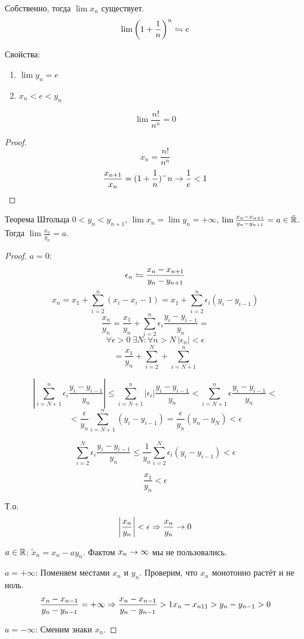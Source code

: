 Собственно, тогда $\lim x_n$ существует.
$$\lim \left(1+\frac1n\right)^n \leftrightharpoons e$$

Свойства:
\begin{enumerate}
\item $\lim y_n = e$
\item $x_n < e < y_n$
\end{enumerate}

\begin{conseq}
$$\lim \frac{n!}{n^n} = 0$$
\end{conseq}
\begin{proof}
$$x_n = \frac{n!}{n^n}$$
$$\frac{x_{n+1}}{x_n} = (1+\frac1n)^-n \rightarrow \frac1e < 1$$
\end{proof}

\begin{theorem}{Теорема Штольца}
$0<y_n<y_{n+1}$, $\lim x_n = \lim y_n = +\infty$, $\lim \frac{x_n-x_{n+1}}{y_n-y_{n+1}} = a \in \bar{\mathbb{R}}$.
Тогда $\lim \frac{x_n}{y_n} = a$.
\end{theorem}
\begin{proof}
$a = 0$:
$$\epsilon_n \leftrightharpoons \frac{x_n - x_{n+1}}{y_n - y_{n+1}}$$
$$x_n = x_1 + \sum_{i=2}^n (x_i - x_i-1) = x_1 + \sum_{i=2}^n \epsilon_i(y_i - y_{i-1})$$
$$\frac{x_n}{y_n} = \frac{x_1}{y_n} + \sum_{i=2}^n \epsilon_i \frac{y_i - y_{i-1}}{y_n} = $$
$$\forall \epsilon > 0\: \exists N\colon \forall n > N\: |\epsilon_n| < \epsilon$$
$$= \frac{x_1}{y_n} + \sum_{i=2}^N + \sum_{i=N+1}^n$$

$$\left|\sum_{i=N+1}^n \epsilon_i \frac{y_i - y_{i-1}}{y_n}\right| \leqslant \sum_{i=N+1}^n |\epsilon_i| \frac{y_i - y_{i-1}}{y_n} < 
\sum_{i=N+1}^n \epsilon \frac{y_i - y_{i-1}}{y_n} <$$
$$< \frac{\epsilon}{y_n}\sum_{i=N+1}^n (y_i - y_{i-1}) = \frac{\epsilon}{y_n} (y_n - y_N) < \epsilon$$

$$\sum_{i=2}^N \epsilon_i \frac{y_i - y_{i-1}}{y_n} \leqslant \frac{1}{y_n}\sum_{i=2}^N \epsilon_i(y_i - y_{i-1}) < \epsilon$$

$$\frac{x_1}{y_n} < \epsilon$$

Т.о.
$$\left|\frac{x_n}{y_n}\right| < \epsilon \Rightarrow \frac{x_n}{y_n} \rightarrow 0$$

$a\in\mathbb{R}$:
$\tilde x_n = x_n - a y_n$. Фактом $x_n\rightarrow\infty$ мы не пользовались.

$a=+\infty$: Поменяем местами $x_n$ и $y_n$. Проверим, что $x_n$ монотонно растёт и не ноль.
$$\frac{x_n - x_{n-1}}{y_n - y_{n-1}} = +\infty \Rightarrow \frac{x_n - x_{n-1}}{y_n - y_{n-1}} > 1 x_n - x_{n11} > y_n - y_{n-1} > 0$$

$a=-\infty$: Сменим знаки $x_n$.
\end{proof}

